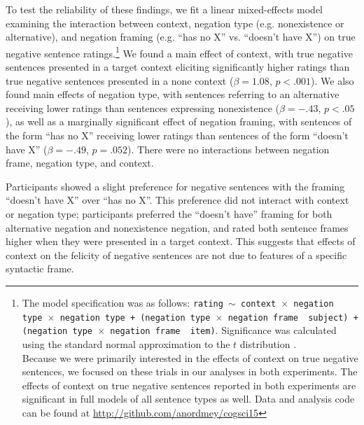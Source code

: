 \documentclass[10pt,letterpaper]{article}
\begin{document}

 
To test the reliability of these findings, we fit a linear mixed-effects model examining the interaction between context, negation type (e.g. nonexistence or alternative), and negation framing (e.g. ``has no X'' vs. ``doesn't have X'') on true negative sentence ratings.\footnote{ The model specification was as follows: \texttt{rating $\sim$ context~$\times$~negation type~$\times$~negation type + (negation type~$\times$~negation frame~\textbar~subject) +  (negation type~$\times$~negation frame~\textbar~item)}.  Significance was calculated using the standard normal approximation to the $t$ distribution \cite{barr2013}. \\  \indent Because we were primarily interested in the effects of context on true negative sentences, we focused on these trials in our analyses in both experiments.  The effects of context on true negative sentences reported in both experiments are significant in full models of all sentence types as well. Data and analysis code can be found at \href{http://github.com/anordmey/cogsci15}{http://github.com/anordmey/cogsci15}}  We found a main effect of context, with true negative sentences presented in a target context eliciting significantly higher ratings than true negative sentences presented in a none context ($\beta= 1.08$, $p< .001$).  We also found main effects of negation type, with sentences referring to an alternative receiving lower ratings than sentences expressing nonexistence ($\beta= -.43$, $p< .05$), as well as a marginally significant effect of negation framing, with sentences of the form ``has no X'' receiving lower ratings than sentences of the form ``doesn't have X''  ($\beta= -.49$, $p= .052$).  There were no interactions between negation frame, negation type, and context.  

Participants showed a slight preference for negative sentences with the framing ``doesn't have X'' over ``has no X''.  This preference did not interact with context or negation type; participants preferred the ``doesn't have'' framing for both alternative negation and nonexistence negation, and rated both sentence frames higher when they were presented in a target context.  This suggests that effects of context on the felicity of negative sentences are not due to features of a specific syntactic frame.
\end{document}
